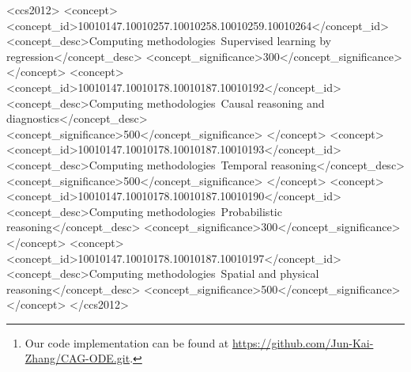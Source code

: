 \documentclass[sigconf]{acmart}
\begin{document}
\begin{abstract}
Real-world multi-agent systems are often dynamic and continuous, where the agents co-evolve and undergo changes in their trajectories and interactions over time. For example, the COVID-19 transmission in the U.S. can be viewed as a multi-agent system, where states act as agents and daily population movements between them are interactions. Estimating the counterfactual outcomes in such systems enables accurate future predictions and effective decision-making, such as formulating COVID-19 policies.
However, existing methods fail to model the continuous dynamic effects of treatments on the outcome, especially when multiple treatments (e.g., "stay-at-home" and "get-vaccine" policies) are applied simultaneously.
To tackle this challenge,  we propose Causal Graph Ordinary Differential Equations (CAG-ODE), a novel model that captures the continuous interaction among agents using a Graph Neural Network (GNN) as the ODE function. The key innovation of our model is to learn time-dependent representations of treatments and incorporate them into the ODE function, enabling precise predictions of potential outcomes. To mitigate confounding bias, we further propose two domain adversarial learning-based objectives, which enable our model to learn balanced continuous representations that are not affected by treatments or interference. Experiments on two datasets (i.e., COVID-19 and tumor growth) demonstrate the superior performance of our proposed model. \footnote{Our code implementation can be found at \url{https://github.com/Jun-Kai-Zhang/CAG-ODE.git}.}
\end{abstract}

\begin{CCSXML}
<ccs2012>
   <concept>
       <concept_id>10010147.10010257.10010258.10010259.10010264</concept_id>
       <concept_desc>Computing methodologies~Supervised learning by regression</concept_desc>
       <concept_significance>300</concept_significance>
       </concept>
   <concept>
       <concept_id>10010147.10010178.10010187.10010192</concept_id>
       <concept_desc>Computing methodologies~Causal reasoning and diagnostics</concept_desc>
       <concept_significance>500</concept_significance>
       </concept>
   <concept>
       <concept_id>10010147.10010178.10010187.10010193</concept_id>
       <concept_desc>Computing methodologies~Temporal reasoning</concept_desc>
       <concept_significance>500</concept_significance>
       </concept>
   <concept>
       <concept_id>10010147.10010178.10010187.10010190</concept_id>
       <concept_desc>Computing methodologies~Probabilistic reasoning</concept_desc>
       <concept_significance>300</concept_significance>
       </concept>
   <concept>
       <concept_id>10010147.10010178.10010187.10010197</concept_id>
       <concept_desc>Computing methodologies~Spatial and physical reasoning</concept_desc>
       <concept_significance>500</concept_significance>
       </concept>
 </ccs2012>
\end{CCSXML}
\end{document}
